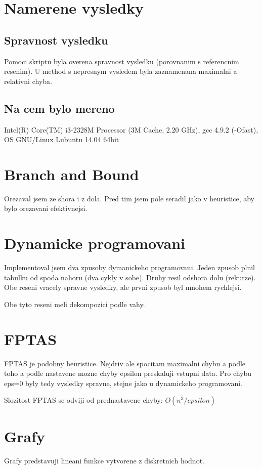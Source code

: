 \documentclass[12pt,a4paper]{article}
\begin{document}
\section{Namerene vysledky}

\subsection{Spravnost vysledku}
Pomoci skriptu byla overena spravnost vysledku (porovnanim s referencnim resenim). U method s nepresnym vysledem byla zaznamenana maximalni a relativni chyba.

\subsection{Na cem bylo mereno}
Intel(R) Core(TM) i3-2328M Processor (3M Cache, 2.20 GHz), gcc 4.9.2 (-Ofast), OS GNU/Linux Lubuntu 14.04 64bit

\section{Branch and Bound}
Orezaval jsem ze shora i z dola. Pred tim jsem pole seradil jako v heuristice, aby bylo orezavani efektivnejsi.

\section{Dynamicke programovani}
Implementoval jsem dva zpusoby dymanickeho programovani. Jeden zpusob plnil tabulku od spoda nahoru (dva cykly v sobe).
Druhy resil odshora dolu (rekurze). Obe reseni vracely spravne vysledky, ale prvni zpusob byl mnohem rychlejsi.

Obe tyto reseni meli dekompozici podle vahy.

\section{FPTAS}
FPTAS je podobny heuristice. Nejdriv ale spocitam maximalni chybu a podle toho a podle nastavene mozne chyby epsilon preskaluji vstupni data. Pro chybu eps=0 byly tedy vysledky spravne, stejne jako u dynamickeho programovani.

Slozitost FPTAS se odviji od prednastavene chyby: $O(n^3 / epsilon)$
\section{Grafy}

Grafy predstavuji lineani funkce vytvorene z diskretnich hodnot.
\end{document}
